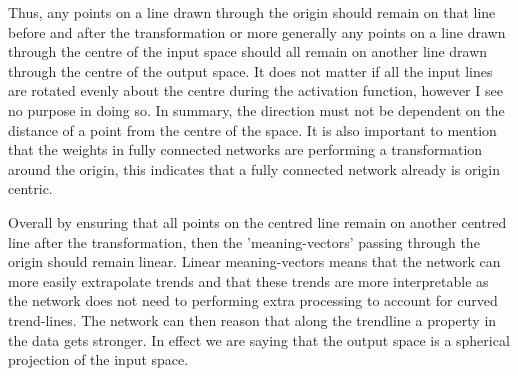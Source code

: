 \documentclass[onecolumn]{article}
\begin{document}
    Thus, any points on a line drawn through the origin should remain on that line before and after the transformation or more generally any points on a line drawn through the centre of the input space should all remain on another line drawn through the centre of the output space. It does not matter if all the input lines are rotated evenly about the centre during the activation function, however I see no purpose in doing so. In summary, the direction must not be dependent on the distance of a point from the centre of the space. It is also important to mention that the weights in fully connected networks are performing a transformation around the origin, this indicates that a fully connected network already is origin centric.

    Overall by ensuring that all points on the centred line remain on another centred line after the transformation, then the 'meaning-vectors' passing through the origin should remain linear. Linear meaning-vectors means that the network can more easily extrapolate trends and that these trends are more interpretable as the network does not need to performing extra processing to account for curved trend-lines. The network can then reason that along the trendline a property in the data gets stronger. In effect we are saying that the output space is a spherical projection of the input space.

        
    
\end{document}
